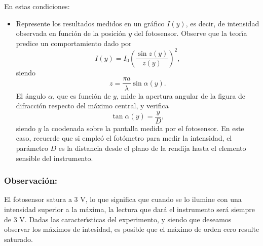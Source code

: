 \documentclass[laboratorio]{guia}
\begin{document}
En estas condiciones:
\begin{itemize}
    \item Represente los resultados medidos en un gr\'afico $I(y)$, es decir,
        de intensidad observada en funci\'on de la posici\'on $y$ del
        fotosensor. Observe que la teor\'\i a predice un comportamiento dado
        por
        \begin{equation}
            I(y) = I_0 \left(\frac{\sin z(y)}{z(y)} \right)^2,
        \end{equation}
        siendo 
        \begin{equation*}
            z = \frac{\pi a}{\lambda} \sin \alpha(y).
        \end{equation*}
El \'angulo $\alpha$, que es funci\'on de $y$, mide la apertura angular de la 
figura de difracci\'on respecto del m\'aximo central, y verifica
\begin{equation}
    \tan \alpha(y) = \frac{y}{D},
\end{equation}
siendo $y$ la coodenada sobre la pantalla medida por el fotosensor. En este
caso, recuerde que si emple\'o el fot\'ometro para medir la intensidad, el
par\'ametro $D$ es la distancia desde el plano de la rendija hasta el elemento
sensible del instrumento.
\end{itemize}

\subsubsection*{Observaci\'on:}

El fotosensor satura a 3 V, lo que significa que cuando se lo ilumine con una
intensidad superior a la m\'axima, la lectura que dar\'a el instrumento ser\'a
siempre de 3 V. Dadas las caracter\'\i sticas del experimento, y siendo que 
deseamos observar los m\'aximos de intesidad, es posible que el m\'aximo de
orden cero resulte saturado. 


\nocite{Alonso1998,Jenkins2001,Hecht1986}
 

\end{document}
